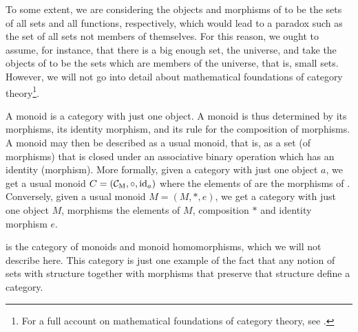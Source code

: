 \begin{example}
\begin{remark}


    To some extent, we are considering the objects and morphisms of
    \set to be the sets of all sets and all functions, respectively,
    which would lead to a paradox such as the set of all sets not
    members of themselves. For this reason, we ought to assume, for
    instance, that there is a big enough set, the universe, and take
    the objects of \set to be the sets which are members of the
    universe, that is, small sets. However, we will not go into detail
    about mathematical foundations of category theory\footnote{For a
      full account on mathematical foundations of category theory, see
      \parencites[§ 1.8]{awodey-2010}[§ I.6]{maclane-1998}.}.

  \end{remark}

\end{example}


\begin{example}
  \label{ex:category-monoid}



  A monoid is a category with just one object. A monoid is thus
  determined by its morphisms, its identity morphism, and its rule for
  the composition of morphisms. A monoid may then be described as a
  usual monoid, that is, as a set (of morphisms) that is closed under
  an associative binary operation which has an identity (morphism).
  More formally, given a category  with just one object $a$, we
  get a usual monoid $C = (\mathcal{C}_{\operatorname{M}}, \mathrel{\circ}, \operatorname{id}_{a})$ where the
  elements of  are the morphisms of . Conversely, given
  a usual monoid $M = (M, *, e)$, we get a category  with just
  one object $M$, morphisms the elements of $M$, composition $*$ and
  identity morphism $e$.

  \begin{remark}
    \label{re:category-mon}


     is the category of monoids and monoid homomorphisms,
    which we will not describe here. This category is just one example
    of the fact that any notion of sets with structure together with
    morphisms that preserve that structure define a category.

  \end{remark}

\end{example}

